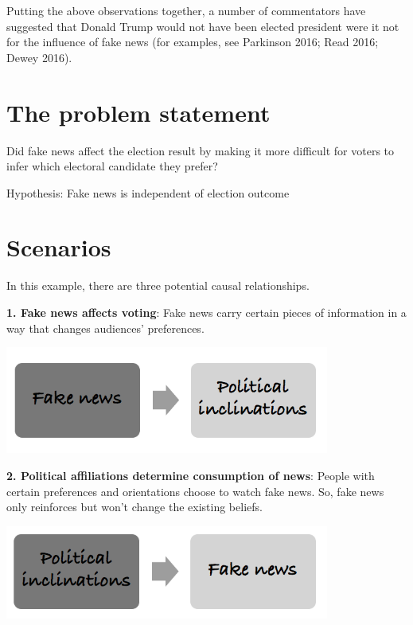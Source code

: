 \documentclass[]{book}
\begin{document}
Putting the above observations together, a number of commentators have suggested that Donald Trump would not have been elected president were it not for the influence of fake news (for examples, see Parkinson 2016; Read 2016; Dewey 2016).

\hypertarget{the-problem-statement}{%
\section{The problem statement}\label{the-problem-statement}}

Did fake news affect the election result by making it more difficult for voters to infer which electoral
candidate they prefer?

Hypothesis: Fake news is independent of election outcome

\hypertarget{scenarios}{%
\section{Scenarios}\label{scenarios}}

In this example, there are three potential causal relationships.

\textbf{1. Fake news affects voting}: Fake news carry certain pieces of information in a way that changes audiences' preferences.

\includegraphics[width=0.8\textwidth,height=\textheight]{fig/scenario1.png}

\textbf{2. Political affiliations determine consumption of news}: People with certain preferences and orientations choose to watch fake news. So, fake news only reinforces but won't change the existing beliefs.

\includegraphics[width=0.8\textwidth,height=\textheight]{fig/scenario2.png}
\end{document}
